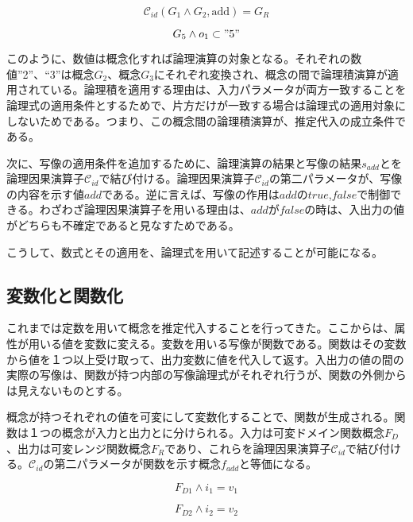 \documentclass[12pt]{article}
\begin{document}
\begin{equation} \mathcal{C}_{id}( G_{1} \wedge G_{2},\text{add})=G_{R}\end{equation}

\begin{equation} G_{5}  \wedge o_1 \subset "5"\end{equation}

このように、数値は概念化すれば論理演算の対象となる。それぞれの数値''2''、``3''は概念\(G_2\)、概念\(G_3\)にそれぞれ変換され、概念の間で論理積演算が適用されている。論理積を適用する理由は、入力パラメータが両方一致することを論理式の適用条件とするためで、片方だけが一致する場合は論理式の適用対象にしないためである。つまり、この概念間の論理積演算が、推定代入の成立条件である。

次に、写像の適用条件を追加するために、論理演算の結果と写像の結果\(s_{add}\)とを論理因果演算子\(\mathcal{C}_{id}\)で結び付ける。論理因果演算子\(\mathcal{C}_{id}\)の第二パラメータが、写像の内容を示す値\(add\)である。逆に言えば、写像の作用は\(add\)の\(true\),\(false\)で制御できる。わざわざ論理因果演算子を用いる理由は、\(add\)が\(false\)の時は、入出力の値がどちらも不確定であると見なすためである。

こうして、数式とその適用を、論理式を用いて記述することが可能になる。

\subsection{変数化と関数化}\label{ux5909ux6570ux5316ux3068ux95a2ux6570ux5316}

これまでは定数を用いて概念を推定代入することを行ってきた。ここからは、属性が用いる値を変数に変える。変数を用いる写像が関数である。関数はその変数から値を１つ以上受け取って、出力変数に値を代入して返す。入出力の値の間の実際の写像は、関数が持つ内部の写像論理式がそれぞれ行うが、関数の外側からは見えないものとする。

概念が持つそれぞれの値を可変にして変数化することで、関数が生成される。関数は１つの概念が入力と出力とに分けられる。入力は可変ドメイン関数概念\(F_D\)、出力は可変レンジ関数概念\(F_R\)であり、これらを論理因果演算子\(\mathcal{C}_{id}\)で結び付ける。\(\mathcal{C}_{id}\)の第二パラメータが関数を示す概念\(f_{add}\)と等価になる。

\begin{equation} F_{D1} \wedge i_1 = v_1\end{equation}

\begin{equation} F_{D2} \wedge i_2 = v_2\end{equation}
\end{document}
